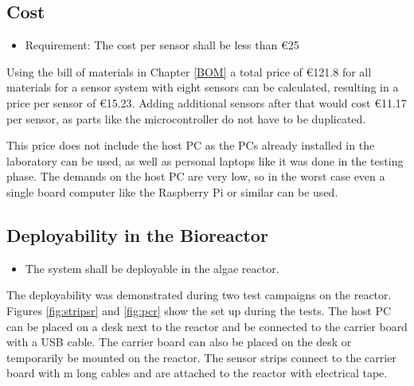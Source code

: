 \subsection{Cost}

\begin{itemize}
\item Requirement: The cost per sensor shall be less than \euro{25}
\end{itemize}

Using the bill of materials in Chapter \ref{BOM} a total price of \euro{121.8} for all materials for a sensor system with eight sensors can be calculated, resulting in a price per sensor of \euro{15.23}. Adding additional sensors after that would cost \euro{11.17} per sensor, as parts like the microcontroller do not have to be duplicated.

This price does not include the host PC as the PCs already installed in the laboratory can be used, as well as personal laptops like it was done in the testing phase. The demands on the host PC are very low, so in the worst case even a single board computer like the Raspberry Pi or similar can be used.

\subsection{Deployability in the Bioreactor}

\begin{itemize}
\item  The system shall be deployable in the algae reactor.\\
\end{itemize}

The deployability was demonstrated during two test campaigns on the reactor. Figures \ref{fig:stripsr} and \ref{fig:pcr} show the set up during the tests. The host PC can be placed on a desk next to the reactor and be connected to the carrier board with a USB cable. The carrier board can also be placed on the desk or temporarily be mounted on the reactor. The sensor strips connect to the carrier board with \unit[1]{m} long cables and are attached to the reactor with electrical tape.

